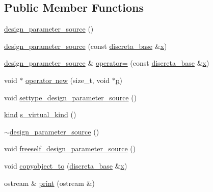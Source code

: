 \subsection*{Public Member Functions}
\begin{DoxyCompactItemize}
\item 
\mbox{\hyperlink{classdesign__parameter__source_a64aac686b9e422a471d0f26351fb2bf0}{design\+\_\+parameter\+\_\+source}} ()
\item 
\mbox{\hyperlink{classdesign__parameter__source_a55246ea5ad8cac9ff7ff2d51a8dc476d}{design\+\_\+parameter\+\_\+source}} (const \mbox{\hyperlink{classdiscreta__base}{discreta\+\_\+base}} \&\mbox{\hyperlink{alphabet2_8_c_a6150e0515f7202e2fb518f7206ed97dc}{x}})
\item 
\mbox{\hyperlink{classdesign__parameter__source}{design\+\_\+parameter\+\_\+source}} \& \mbox{\hyperlink{classdesign__parameter__source_a92328345a02bb0028f77b5d4780d55d6}{operator=}} (const \mbox{\hyperlink{classdiscreta__base}{discreta\+\_\+base}} \&\mbox{\hyperlink{alphabet2_8_c_a6150e0515f7202e2fb518f7206ed97dc}{x}})
\item 
void $\ast$ \mbox{\hyperlink{classdesign__parameter__source_a597be327e3bf9c49aa9bbb96c10467a8}{operator new}} (size\+\_\+t, void $\ast$\mbox{\hyperlink{alphabet2_8_c_a533391314665d6bf1b5575e9a9cd8552}{p}})
\item 
void \mbox{\hyperlink{classdesign__parameter__source_a3af3b851df87bd1661fb9c9ce18822c8}{settype\+\_\+design\+\_\+parameter\+\_\+source}} ()
\item 
\mbox{\hyperlink{discreta_8h_aaf25ee7e2306d78c74ec7bc48f092e81}{kind}} \mbox{\hyperlink{classdesign__parameter__source_ad3ee1c1d1dfa39a6eb3e2ee538b0e350}{s\+\_\+virtual\+\_\+kind}} ()
\item 
\mbox{\hyperlink{classdesign__parameter__source_a7ad9a758b6d4f591d935777bba923b9c}{$\sim$design\+\_\+parameter\+\_\+source}} ()
\item 
void \mbox{\hyperlink{classdesign__parameter__source_a61e751fbde5330ede70525d4953bbc79}{freeself\+\_\+design\+\_\+parameter\+\_\+source}} ()
\item 
void \mbox{\hyperlink{classdesign__parameter__source_a1fd0910addc02ffe117ec08d0f93f8a6}{copyobject\+\_\+to}} (\mbox{\hyperlink{classdiscreta__base}{discreta\+\_\+base}} \&\mbox{\hyperlink{alphabet2_8_c_a6150e0515f7202e2fb518f7206ed97dc}{x}})
\item 
ostream \& \mbox{\hyperlink{classdesign__parameter__source_a50fb37085011959ea40a4087353377b4}{print}} (ostream \&)
\item 

\end{DoxyCompactItemize}

